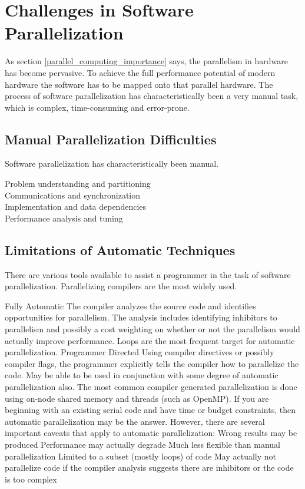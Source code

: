 \section{Challenges in Software Parallelization}
As section \ref{parallel_computing_importance} says, the parallelism in hardware has become pervasive. To achieve the full performance potential of modern hardware the software has to be mapped onto that parallel hardware. The process of software parallelization has characteristically been a very manual task, which is complex, time-consuming and error-prone.     

\subsection{Manual Parallelization Difficulties}
\quad Software parallelization has characteristically been manual. 
\begin{description}
\item[Problem understanding and partitioning]
\item[Communications and synchronization]
\item[Implementation and data dependencies]
\item[Performance analysis and tuning]
\end{description}

\subsection{Limitations of Automatic Techniques}
\quad There are various tools available to assist a programmer in the task of software parallelization. Parallelizing compilers are the most widely used.

Fully Automatic
The compiler analyzes the source code and identifies opportunities for parallelism.
The analysis includes identifying inhibitors to parallelism and possibly a cost weighting on whether or not the parallelism would actually improve performance. Loops are the most frequent target for automatic parallelization. Programmer Directed 
Using compiler directives or possibly compiler flags, the programmer explicitly tells the compiler how to parallelize the code. May be able to be used in conjunction with some degree of automatic parallelization also. The most common compiler generated parallelization is done using on-node shared memory and threads (such as OpenMP). If you are beginning with an existing serial code and have time or budget constraints, then automatic parallelization may be the answer. However, there are several important caveats that apply to automatic parallelization: Wrong results may be produced Performance may actually degrade Much less flexible than manual parallelization Limited to a subset (mostly loops) of code May actually not parallelize code if the compiler analysis suggests there are inhibitors or the code is too complex 

